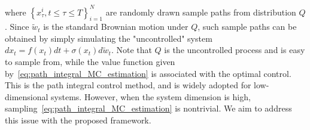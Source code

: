 \documentclass[letterpaper]{article} %
\begin{document}
where $\left\{x_{\tau}^{i}, t \leq \tau \leq T\right\}_{i=1}^{N}$ are randomly drawn sample paths from distribution $Q$. 
Since $\tilde{w}_t$ is the standard Brownian motion under $Q$, such sample paths can be obtained by simply simulating the "uncontrolled" system $dx_t = f(x_t)dt + \sigma(x_t) d\tilde{w}_t$.
Note that $Q$ is the uncontrolled process and is easy to sample from, while the value function given by~\eqref{eq:path_integral_MC_estimation} is associated with the optimal control.
This is the path integral control method, and is widely adopted for low-dimensional systems. However, when the system dimension is high, sampling~\eqref{eq:path_integral_MC_estimation} is nontrivial. We aim to address this issue with the proposed framework.


\end{document}
